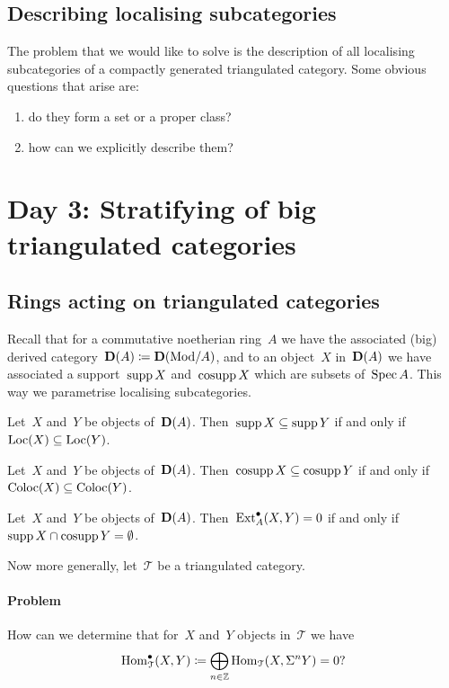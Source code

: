 \documentclass[10pt,a4paper]{article}
\begin{document}
\subsection{Describing localising subcategories}
The problem that we would like to solve is the description of all localising subcategories of a compactly generated triangulated category. Some obvious questions that arise are:
\begin{enumerate}
  \item do they form a set or a proper class?
  \item how can we explicitly describe them?
\end{enumerate}



\section{Day 3: Stratifying of big triangulated categories}
\subsection{Rings acting on triangulated categories}
Recall that for a commutative noetherian ring~$A$ we have the associated (big) derived category~$\mathbf{D}(A)\coloneqq\mathbf{D}(\mathrm{Mod}/A)$, and to an object~$X$ in~$\mathbf{D}(A)$ we have associated a support~$\operatorname{supp} X$ and~$\operatorname{cosupp} X$ which are subsets of~$\operatorname{Spec} A$. This way we parametrise localising subcategories.
\begin{lemma}
  Let~$X$ and~$Y$ be objects of~$\mathbf{D}(A)$. Then~$\operatorname{supp} X\subseteq \operatorname{supp} Y$ if and only if~$\operatorname{Loc}(X)\subseteq\operatorname{Loc}(Y)$.
\end{lemma}

\begin{lemma}
  Let~$X$ and~$Y$ be objects of~$\mathbf{D}(A)$. Then~$\operatorname{cosupp} X\subseteq \operatorname{cosupp} Y$ if and only if~$\operatorname{Coloc}(X)\subseteq\operatorname{Coloc}(Y)$.
\end{lemma}

\begin{corollary}
  Let~$X$ and~$Y$ be objects of~$\mathbf{D}(A)$. Then~$\operatorname{Ext}_A^\bullet(X,Y)=0$ if and only if~$\operatorname{supp} X\cap\operatorname{cosupp} Y=\emptyset$.
\end{corollary}

Now more generally, let~$\mathcal{T}$ be a triangulated category.
\paragraph{Problem} How can we determine that for~$X$ and~$Y$ objects in~$\mathcal{T}$ we have
\begin{equation}
  \operatorname{Hom}_{\mathcal{T}}^\bullet(X,Y)\coloneqq\bigoplus_{n\in\mathbb{Z}}\operatorname{Hom}_{\mathcal{T}}(X,\Sigma^nY)=0?
\end{equation}
\end{document}
